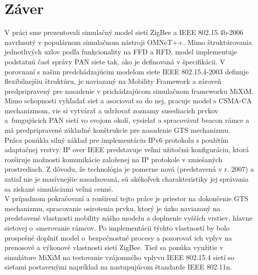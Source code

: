 \chapter{Záver}
\indent\indent V práci sme prezentovali simulačný model sietí ZigBee a IEEE 802.15.4b-2006 navrhnutý v populárnom simulačnom nástroji OMNeT++. Mimo štruktúrovania jednotlivých uzlov podľa funkcionality na FFD a RFD, model implementuje podstatnú časť správy PAN siete tak, ako je definovaná v špecifikácii. V porovnaní s našim predchádzajúcim modelom siete IEEE 802.15.4-2003 definuje flexibilnejšiu štruktúru, je naviazaný na Mobility Framework a zároveň predpripravený pre nasadenie v prichádzajúcom simulačnom frameworku MiXiM. Mimo schopnosti vyhľadať sieť a asociovať sa do nej, pracuje model s CSMA-CA mechanizmom, vie si vytvárať a udržovať zoznamy susediacich prvkov a~fungujúcich PAN sietí vo svojom okolí, vysielať a spracovávať beacon rámce a má predpripravené základné konštrukcie pre nasadenie GTS mechanizmu.\\
\indent Práca ponúkla silný základ pre implementáciu IPv6 protokolu s použitím adaptačnej vrstvy. IP over IEEE predstavuje veľmi užitočnú konfiguráciu, ktorá rozširuje možnosti komunikácie založenej na IP protokole v zmiešaných prostrediach. Z dôvodu, že technológia je pomerne nová (predstavená v r. 2007) a zatiaľ nie je masívnejšie nasadzovaná, sú akékoľvek charakteristiky jej správania sa získané simuláciami veľmi cenné.\\
\indent V prípadnom pokračovaní a rozšírení tejto práce je priestor na dokončenie GTS mechanizmu, spracovanie osirotenia prvku, ktorý je úzko naviazaný na predstavené vlastnosti mobility nášho modelu a doplnenie vyšších vrstiev, hlavne sieťovej o~smerovanie rámcov. Po implementácii týchto vlastností by bolo prospešné doplniť model o~bezpečnostné procesy a pozorovať ich vplyv na prenosové a výkonové vlastnosti sietí ZigBee. Tiež sa ponúka využitie v simulátore MiXiM na testovanie vzájomného vplyvu IEEE 802.15.4 sietí so sieťami postavenými napríklad na nastupujúcom štandarde IEEE 802.11n.\\